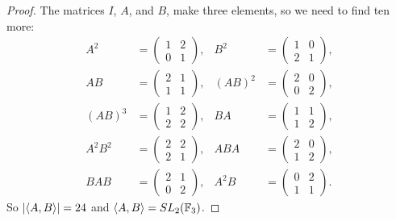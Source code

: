 \begin{proof}
  The matrices $I$, $A$, and $B$, make three elements, so we need to
  find ten more:
  \begin{align*}
    A^2 &= \begin{pmatrix} 1 & 2 \\ 0 & 1 \end{pmatrix}, &
    B^2 &= \begin{pmatrix} 1 & 0 \\ 2 & 1 \end{pmatrix}, \\
    AB &= \begin{pmatrix} 2 & 1 \\ 1 & 1 \end{pmatrix}, &
    (AB)^2 &= \begin{pmatrix} 2 & 0 \\ 0 & 2 \end{pmatrix}, \\
    (AB)^3 &= \begin{pmatrix} 1 & 2 \\ 2 & 2 \end{pmatrix}, &
    BA &= \begin{pmatrix} 1 & 1 \\ 1 & 2 \end{pmatrix}, \\
    A^2B^2 &= \begin{pmatrix} 2 & 2 \\ 2 & 1 \end{pmatrix}, &
    ABA &= \begin{pmatrix} 2 & 0 \\ 1 & 2 \end{pmatrix}, \\
    BAB &= \begin{pmatrix} 2 & 1 \\ 0 & 2 \end{pmatrix}, &
    A^2B &= \begin{pmatrix} 0 & 2 \\ 1 & 1 \end{pmatrix}.
  \end{align*}
  So $\lvert{\langle{A,B}\rangle}\rvert = 24$ and $\langle{A,B}\rangle = SL_2(\mathbb{F}_3)$.
\end{proof}
